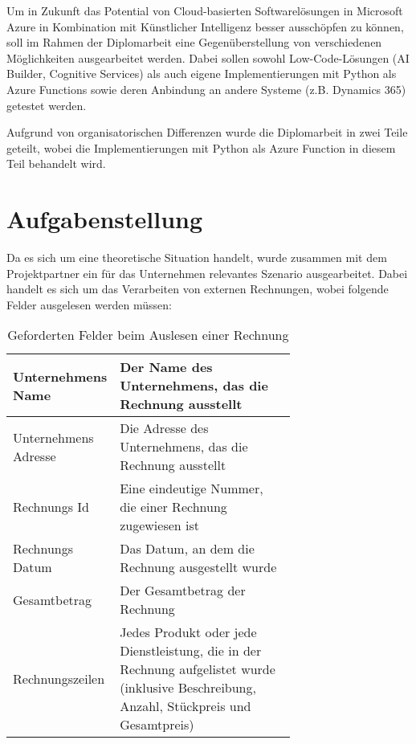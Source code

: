 Um in Zukunft das Potential von Cloud-basierten Softwarelösungen in Microsoft Azure in Kombination mit Künstlicher Intelligenz besser ausschöpfen zu können, soll im Rahmen der Diplomarbeit eine Gegenüberstellung von verschiedenen Möglichkeiten ausgearbeitet werden. Dabei sollen sowohl Low-Code-Lösungen (AI Builder, Cognitive Services) als auch eigene Implementierungen mit Python als Azure Functions sowie deren Anbindung an andere Systeme (z.B. Dynamics 365) getestet werden. 

Aufgrund von organisatorischen Differenzen wurde die Diplomarbeit in zwei Teile geteilt, wobei die Implementierungen mit Python als Azure Function in diesem Teil behandelt wird.

\section{Aufgabenstellung}

Da es sich um eine theoretische Situation handelt, wurde zusammen mit dem Projektpartner ein für das Unternehmen relevantes Szenario ausgearbeitet. Dabei handelt es sich um das Verarbeiten von externen Rechnungen, wobei folgende Felder ausgelesen werden müssen:

\begin{table}[H]
    \centering
    \begin{tabular}{|l|p{0.7\linewidth}|}
    \hline
    Unternehmens Name    & Der Name des Unternehmens, das die Rechnung ausstellt                         \\ \hline
    Unternehmens Adresse & Die Adresse des Unternehmens, das die Rechnung ausstellt                      \\ \hline
    Rechnungs Id         & Eine eindeutige Nummer, die einer Rechnung zugewiesen ist                     \\ \hline
    Rechnungs Datum      & Das Datum, an dem die Rechnung ausgestellt wurde                               \\ \hline
    Gesamtbetrag         & Der Gesamtbetrag der Rechnung                                                 \\ \hline
    Rechnungszeilen      & Jedes Produkt oder jede Dienstleistung, die in der Rechnung aufgelistet wurde (inklusive Beschreibung, Anzahl, Stückpreis und Gesamtpreis)\\ \hline
    \end{tabular}
    \caption{Geforderten Felder beim Auslesen einer Rechnung}
\end{table}